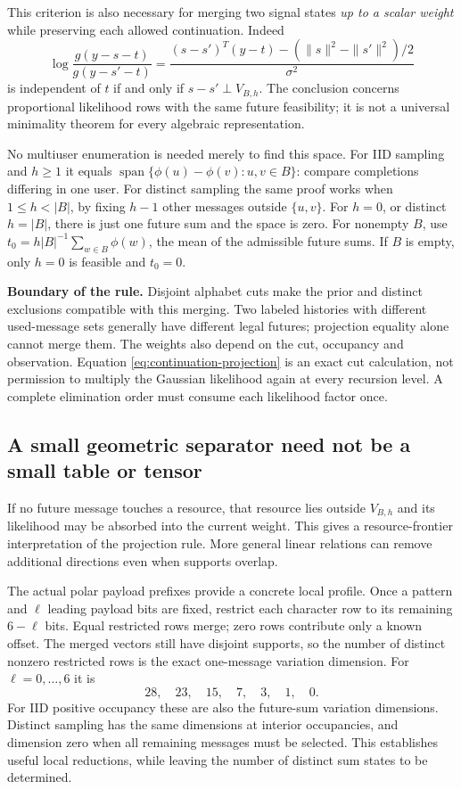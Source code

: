 \documentclass[10pt,a4paper]{article}
\begin{document}
This criterion is also necessary for merging two signal states \emph{up to a scalar weight} while preserving
each allowed continuation. Indeed
\[
 \log\frac{g(y-s-t)}{g(y-s'-t)}
 =\frac{(s-s')^T(y-t)-(\|s\|^2-\|s'\|^2)/2}{\sigma^2}
\]
is independent of $t$ if and only if $s-s'\perp V_{B,h}$.
The conclusion concerns proportional likelihood rows with the same future feasibility; it is not a universal
minimality theorem for every algebraic representation.

No multiuser enumeration is needed merely to find this space. For IID sampling and $h\geq1$ it equals
$\operatorname{span}\{\phi(u)-\phi(v):u,v\in B\}$: compare completions differing in one user.
For distinct sampling the same proof works when $1\leq h<|B|$, by fixing $h-1$ other messages outside
$\{u,v\}$. For $h=0$, or distinct $h=|B|$, there is just one future sum and the space is zero.
For nonempty $B$, use $t_0=h|B|^{-1}\sum_{w\in B}\phi(w)$, the mean of the admissible future sums.
If $B$ is empty, only $h=0$ is feasible and $t_0=0$.

\textbf{Boundary of the rule.} Disjoint alphabet cuts make the prior and distinct exclusions compatible with this
merging. Two labeled histories with different used-message sets generally have different legal futures; projection
equality alone cannot merge them. The weights also depend on the cut, occupancy and observation. Equation
\eqref{eq:continuation-projection} is an exact cut calculation, not permission to multiply the Gaussian likelihood
again at every recursion level. A complete elimination order must consume each likelihood factor once.

\clearpage
\subsection{A small geometric separator need not be a small table or tensor}
If no future message touches a resource, that resource lies outside $V_{B,h}$ and its likelihood may be absorbed
into the current weight. This gives a resource-frontier interpretation of the projection rule. More general
linear relations can remove additional directions even when supports overlap.

The actual polar payload prefixes provide a concrete local profile. Once a pattern and $\ell$ leading payload
bits are fixed, restrict each character row to its remaining $6-\ell$ bits. Equal restricted rows merge;
zero rows contribute only a known offset. The merged vectors still have disjoint supports, so the number of
distinct nonzero restricted rows is the exact one-message variation dimension. For $\ell=0,\ldots,6$ it is
\[
 28,\quad23,\quad15,\quad7,\quad3,\quad1,\quad0.
\]
For IID positive occupancy these are also the future-sum variation dimensions. Distinct sampling has the
same dimensions at interior occupancies, and dimension zero when all remaining messages must be selected.
This establishes useful local reductions, while leaving the number of distinct sum states to be determined.
\end{document}
